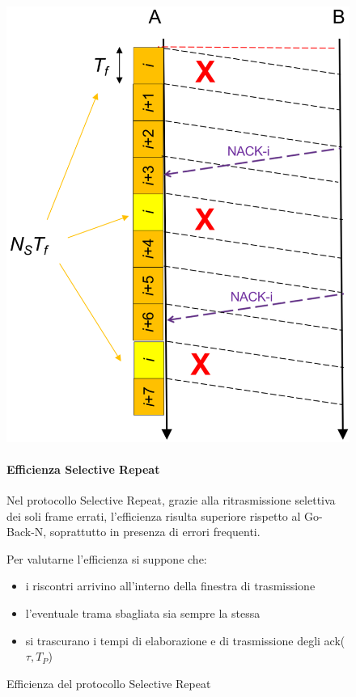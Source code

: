 \begin{figure}[htbp]
    \centering
    \begin{minipage}{0.4\textwidth}
        \includegraphics[width=\linewidth]{images/efficienzasr.png}
        \caption{Efficienza del protocollo Selective Repeat}
    \end{minipage}%
    \hfill
    \begin{minipage}{0.55\textwidth}
        \paragraph{Efficienza Selective Repeat}
        Nel protocollo Selective Repeat, grazie alla ritrasmissione selettiva dei soli frame errati, l'efficienza risulta superiore rispetto al Go-Back-N, soprattutto in presenza di errori frequenti. 

        Per valutarne l'efficienza si suppone che:
        \begin{itemize}
            \item i riscontri arrivino all'interno della finestra di trasmissione
            \item l'eventuale trama sbagliata sia sempre la stessa
            \item si trascurano i tempi di elaborazione e di trasmissione degli ack($\tau, T_P$)
        \end{itemize}


\end{minipage}
\end{figure}
